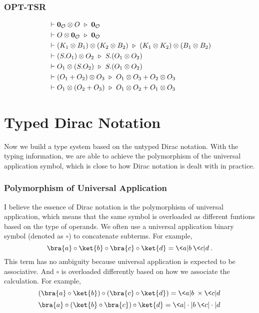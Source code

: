 \subsubsection*{\textsf{OPT-TSR}}
\begin{align*}
  & \vdash \mathbf{0}_\mathcal{O} \otimes O \ \triangleright\  \mathbf{0}_\mathcal{O} \\
  & \vdash O \otimes \mathbf{0}_\mathcal{O} \ \triangleright\  \mathbf{0}_\mathcal{O} \\
  & \vdash (K_1 \otimes B_1) \otimes (K_2 \otimes B_2) \ \triangleright\  (K_1 \otimes K_2) \otimes (B_1 \otimes B_2) \\
  & \vdash (S.O_1) \otimes O_2 \ \triangleright\  S.(O_1 \otimes O_2) \\
  & \vdash O_1 \otimes (S.O_2) \ \triangleright\  S.(O_1 \otimes O_2) \\
  & \vdash (O_1 + O_2) \otimes O_3 \ \triangleright\  O_1 \otimes O_3 + O_2 \otimes O_3 \\
  & \vdash O_1 \otimes (O_2 + O_3) \ \triangleright\  O_1 \otimes O_2 + O_1 \otimes O_3
\end{align*}


\section{Typed Dirac Notation}

Now we build a type system based on the untyped Dirac notation. With the typing information, we are able to achieve the polymorphism of the universal application symbol, which is close to how Dirac notation is dealt with in practice.

\subsubsection*{Polymorphism of Universal Application}

I believe the essence of Dirac notation is the polymorphism of universal application, which means that the same symbol is overloaded as different funtions based on the type of operands. We often use a universal application binary symbol (denoted as $\circ$) to concatenate subterms. For example, 
$$
\bra{a} \circ \ket{b} \circ \bra{c} \circ \ket{d} = \< a | b \> \< c | d \>.
$$
This term has no ambiguity because universal application is expected to be associative. And $\circ$ is overloaded differently based on how we associate the calculation. For example,
$$
(\bra{a} \circ \ket{b}) \circ (\bra{c} \circ \ket{d}) = \< a | b \> \times \< c | d \>
$$
$$
\bra{a} \circ (\ket{b} \circ \bra{c}) \circ \ket{d} = \< a | \cdot | b \>\< c | \cdot | d \>
$$

